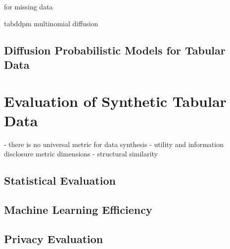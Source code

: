 \cite{rombach2022HighResolutionImageSynthesis}



\cite{zheng2022DiffusionModelsMissing} for missing data

\cite{kotelnikov2022TabDDPMModellingTabular} tabddpm
\cite{hoogeboom2021ArgmaxFlowsMultinomial} multinomial diffusion


\subsection{Diffusion Probabilistic Models for Tabular Data}
\label{ch:preliminaries-generativeAlgorithms-diffusionProbabilisticModelsTabularData}



\section{Evaluation of Synthetic Tabular Data}
\label{ch:preliminaries-evaluationOfSyntheticTabularData}

- there is no universal metric for data synthesis \cite{hernandez2022SyntheticDataGeneration}
- utility and information disclosure metric dimensions \cite{goncalves2020GenerationEvaluationSynthetic}
- structural similarity \cite{elemam2020SevenWaysEvaluate}

\subsection{Statistical Evaluation}
\label{ch:preliminaries-evaluationOfSyntheticTabularData-statisticalEvaluation}

\subsection{Machine Learning Efficiency}
\label{ch:preliminaries-evaluationOfSyntheticTabularData-machineLearningEfficiency}

\subsection{Privacy Evaluation}
\label{ch:preliminaries-evaluationOfSyntheticTabularData-privacyEvaluation}

